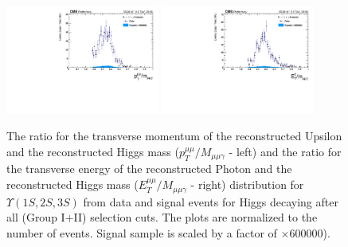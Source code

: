 \begin{figure}[!htbp]
\begin{center}
\includegraphics[width=0.45\textwidth]{figures_and_tables/outputPlots/HtoUpsilon_Cat0_ZZZZZ/nEvts/data_x_mc/withKinCuts/h_withKin_upsilonPt_over_zMass}\hspace*{1.cm}
\includegraphics[width=0.45\textwidth]{figures_and_tables/outputPlots/HtoUpsilon_Cat0_ZZZZZ/nEvts/data_x_mc/withKinCuts/h_withKin_photonPt_over_zMass}
\end{center}\vspace*{-.5cm}
\caption{The ratio for the transverse momentum of the reconstructed Upsilon and the reconstructed Higgs mass ($p_{T}^{\mu\mu}/M_{\mu\mu\gamma}$ - left) and the ratio for the transverse energy of the reconstructed Photon and the reconstructed Higgs mass ($E_{T}^{\mu\mu}/M_{\mu\mu\gamma}$ - right) distribution for $\Upsilon(1S,2S,3S)$ from data and signal events for Higgs decaying after all (Group I+II) selection cuts. The plots are normalized to the number of events. Signal sample is scaled by a factor of $\times 600000$).}
\label{fig:energy_ration_HtoUpsilon_Cat0_groupI_plus_II}
\end{figure}


